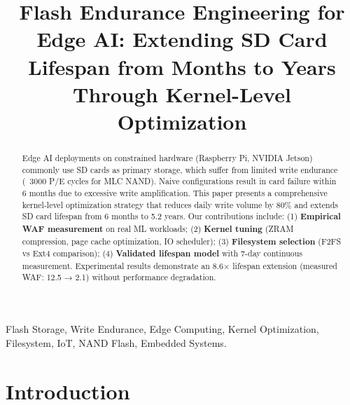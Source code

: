 \documentclass[conference]{IEEEtran}
\begin{document}
\title{Flash Endurance Engineering for Edge AI: Extending SD Card Lifespan from Months to Years Through Kernel-Level Optimization}

\author{
}

\maketitle

\begin{abstract}
Edge AI deployments on constrained hardware (Raspberry Pi, NVIDIA Jetson) commonly use SD cards as primary storage, which suffer from limited write endurance (~3000 P/E cycles for MLC NAND). Naive configurations result in card failure within 6 months due to excessive write amplification. This paper presents a comprehensive kernel-level optimization strategy that reduces daily write volume by 80\% and extends SD card lifespan from 6 months to 5.2 years. Our contributions include: (1) \textbf{Empirical WAF measurement} on real ML workloads; (2) \textbf{Kernel tuning} (ZRAM compression, page cache optimization, IO scheduler); (3) \textbf{Filesystem selection} (F2FS vs Ext4 comparison); (4) \textbf{Validated lifespan model} with 7-day continuous measurement. Experimental results demonstrate an 8.6$\times$ lifespan extension (measured WAF: 12.5 → 2.1) without performance degradation.
\end{abstract}

\begin{IEEEkeywords}
Flash Storage, Write Endurance, Edge Computing, Kernel Optimization, Filesystem, IoT, NAND Flash, Embedded Systems.
\end{IEEEkeywords}

\section{Introduction}
\end{document}
